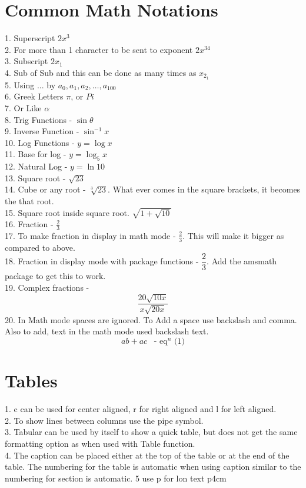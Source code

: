 \documentclass{article}
\begin{document}
\section{Common Math Notations}
1. Superscript $2x^3$\\
2. For more than 1 character to be sent to exponent $2x^{34}$\\
3. Subscript $2x_1$\\
4. Sub of Sub and this can be done as many times as $x_{2_1}$\\
5. Using ... by $a_0, a_1, a_2, \ldots , a_{100}$\\
6. Greek Letters $\pi$, or $Pi$\\
7. Or Like $\alpha$\\
8. Trig Functions - $\sin \theta$\\
9. Inverse Function - $\sin^{-1} x$\\
10. Log Functions - $y = \log x$\\
11. Base for log - $y = \log_5 x$\\
12. Natural Log - $y = \ln 10$\\
13. Square root - $\sqrt{23}$\\
14. Cube or any root - $\sqrt[3]{23}$. What ever comes in the square brackets, it becomes the that root.\\
15. Square root inside square root. $\sqrt{ 1 + \sqrt {10} }$\\
16. Fraction - $\frac{2}{3}$\\
17. To make fraction in display in math mode - $\displaystyle \frac{2}{3}$. This will make it bigger as compared to above.\\
18. Fraction in display mode with package functions - $\dfrac{2}{3}$. Add the amsmath package to get this to work.\\
19. Complex fractions  - $$\frac{20\sqrt{10x}}{x\sqrt{20x}}$$
20. In Math mode spaces are ignored. To Add a space use backslash and comma. Also to add, text in the math mode used backslash text. 
$$ab + ac\,\,\,\,\, \text{- eq$^n$ (1)}$$

\section{Tables}

1. c can be used for center aligned, r for right aligned and l for left aligned.\\
2. To show lines between columns use the pipe symbol.\\
3. Tabular can be used by itself to show a quick table, but does not get the same formatting option as when used with Table function.\\
4. The caption can be placed either at the top of the table or at the end of the table. The numbering for the table is automatic when using caption similar to the numbering for section is automatic.
5 use p for lon text p{4cm}
\end{document}
